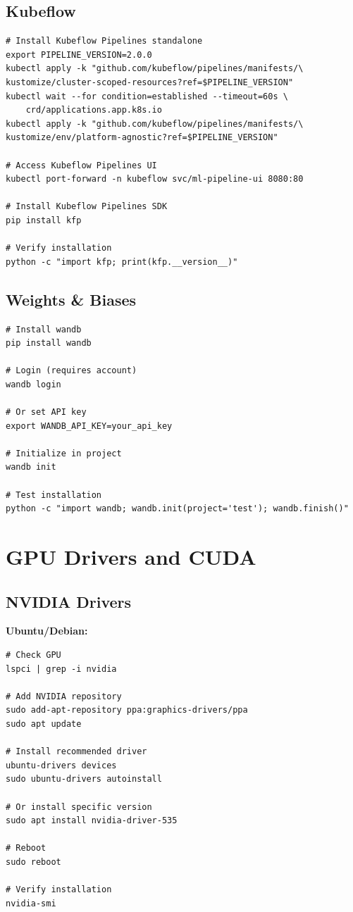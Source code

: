 \subsection{Kubeflow}

\begin{lstlisting}[style=shell]
# Install Kubeflow Pipelines standalone
export PIPELINE_VERSION=2.0.0
kubectl apply -k "github.com/kubeflow/pipelines/manifests/\
kustomize/cluster-scoped-resources?ref=$PIPELINE_VERSION"
kubectl wait --for condition=established --timeout=60s \
    crd/applications.app.k8s.io
kubectl apply -k "github.com/kubeflow/pipelines/manifests/\
kustomize/env/platform-agnostic?ref=$PIPELINE_VERSION"

# Access Kubeflow Pipelines UI
kubectl port-forward -n kubeflow svc/ml-pipeline-ui 8080:80

# Install Kubeflow Pipelines SDK
pip install kfp

# Verify installation
python -c "import kfp; print(kfp.__version__)"
\end{lstlisting}

\subsection{Weights \& Biases}

\begin{lstlisting}[style=shell]
# Install wandb
pip install wandb

# Login (requires account)
wandb login

# Or set API key
export WANDB_API_KEY=your_api_key

# Initialize in project
wandb init

# Test installation
python -c "import wandb; wandb.init(project='test'); wandb.finish()"
\end{lstlisting}

\section{GPU Drivers and CUDA}

\subsection{NVIDIA Drivers}

\textbf{Ubuntu/Debian:}
\begin{lstlisting}[style=shell]
# Check GPU
lspci | grep -i nvidia

# Add NVIDIA repository
sudo add-apt-repository ppa:graphics-drivers/ppa
sudo apt update

# Install recommended driver
ubuntu-drivers devices
sudo ubuntu-drivers autoinstall

# Or install specific version
sudo apt install nvidia-driver-535

# Reboot
sudo reboot

# Verify installation
nvidia-smi
\end{lstlisting}

